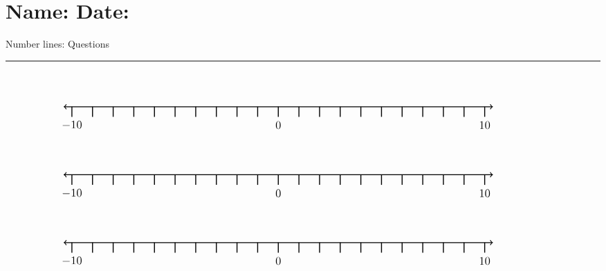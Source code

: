 \documentclass[leqno, 12pt]{article}
\def \HeadingQuestions {\section*{\Large Name: \underline{\hspace{8cm}} \hfill Date: \underline{\hspace{3cm}}} \vspace{-3mm}
{Number lines: Questions} \vspace{1pt}\hrule}
\begin{document}
  \HeadingQuestions
  \vspace{-1mm}
  \begin{equation}
    \begin{tikzpicture}[scale=0.75, baseline={([yshift=-1pt]current bounding box.north)}]
        \draw[{To[scale=1.3]}-{To[scale=1.3]}, line width=1pt] (-10.4, 0) -- (10.4, 0);
        \foreach \x in {-10,-9,...,10}
            \draw[shift={(\x,0)},color=black, line width=1pt] (0pt,-14pt) -- (0pt,0pt);
        \foreach \x in {-10,0,10}
            \draw[shift={(\x,-0.8)},color=black] node[font=\large,text height=12pt] {$\x$};
        \node [font=\large, minimum width=30mm] at (11.0,1.2) {$  $};
    \end{tikzpicture}
\end{equation}
\vspace{10pt}\begin{equation}
    \begin{tikzpicture}[scale=0.75, baseline={([yshift=-1pt]current bounding box.north)}]
        \draw[{To[scale=1.3]}-{To[scale=1.3]}, line width=1pt] (-10.4, 0) -- (10.4, 0);
        \foreach \x in {-10,-9,...,10}
            \draw[shift={(\x,0)},color=black, line width=1pt] (0pt,-14pt) -- (0pt,0pt);
        \foreach \x in {-10,0,10}
            \draw[shift={(\x,-0.8)},color=black] node[font=\large,text height=12pt] {$\x$};
        \node [font=\large, minimum width=30mm] at (11.0,1.2) {$  $};
    \end{tikzpicture}
\end{equation}
\vspace{10pt}\begin{equation}
    \begin{tikzpicture}[scale=0.75, baseline={([yshift=-1pt]current bounding box.north)}]
        \draw[{To[scale=1.3]}-{To[scale=1.3]}, line width=1pt] (-10.4, 0) -- (10.4, 0);
        \foreach \x in {-10,-9,...,10}
            \draw[shift={(\x,0)},color=black, line width=1pt] (0pt,-14pt) -- (0pt,0pt);
        \foreach \x in {-10,0,10}
            \draw[shift={(\x,-0.8)},color=black] node[font=\large,text height=12pt] {$\x$};
        \node [font=\large, minimum width=30mm] at (11.0,1.2) {$  $};
    \end{tikzpicture}
\end{equation}
\end{document}
